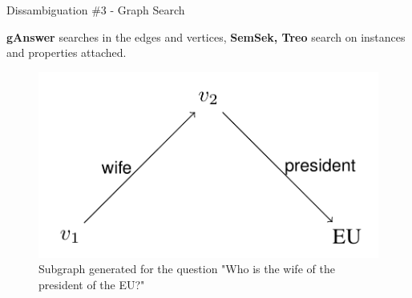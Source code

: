\documentclass{beamer}
\begin{document}

\begin{frame}{Dissambiguation \#3 - Graph Search}
  \begin{cardTiny}
    \textbf{gAnswer} searches in the edges and vertices, \textbf{SemSek, Treo} search on instances and properties attached.
    \begin{figure}\label{fig:subgraph}
      \centering
      \includegraphics[height=0.45\textheight]{./res/subgraph.png}
      \caption{Subgraph generated for the question "Who is the wife of the president of the EU?"}
    \end{figure}
  \end{cardTiny}
\end{frame}
\end{document}
